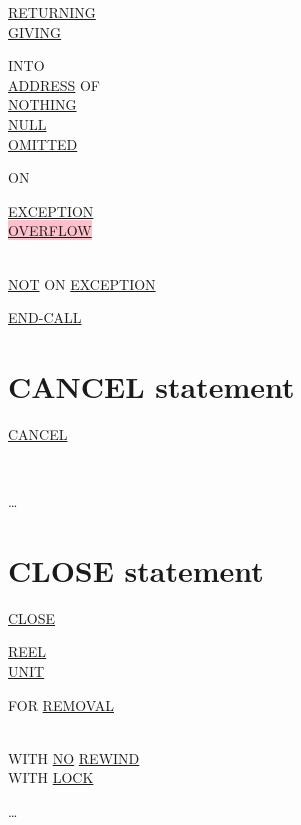 \documentclass[a4paper,oneside,svgnames]{scrbook}
\makeatletter
\newcommand{\key}[1]{\underline{#1}}
\newcommand{\archaic}[1]{%
  \colorbox{pink}{#1}}
\newcommand{\gnucobol}[1]{%
  \colorbox{orange!75}{#1}}
\newcommand{\miscext}[1]{%
  \colorbox{blue!50}{#1}}
\newenvironment{0-1}{$\left[ \begin{tabular}{@{}l@{}}}{\end{tabular} \right]$}
\newenvironment{0+}{$\left[\left| \begin{tabular}{@{}l@{}}}{\end{tabular} \right|\right]$}
\newenvironment{1=}{$\left\{ \begin{tabular}{@{}l@{}}}{\end{tabular} \right\}$}
\makeatother
\begin{document}
\begin{0-1}
  \begin{1=}
    \key{RETURNING} \\
    \miscext{\key{GIVING}}
  \end{1=}
  \begin{1=}
    INTO \identifier \\
    \key{ADDRESS} OF \identifier \\
    \gnucobol{\key{NOTHING}} \\
    \key{NULL} \\
    \key{OMITTED} \\
  \end{1=}
\end{0-1}

\begin{0+}
  ON
  \begin{1=}
    \key{EXCEPTION} \\
    \archaic{\key{OVERFLOW}}
  \end{1=}
  \imperativestatement \\
  \key{NOT} ON \key{EXCEPTION} \imperativestatement
\end{0+}

\begin{0-1}
  \key{END-CALL}
\end{0-1}

\section{CANCEL statement}

\key{CANCEL}
\begin{1=}
  \identifier \\
  \literal
\end{1=} \ldots

\section{CLOSE statement}

\key{CLOSE}
\begin{1=}
  \filename
  \begin{0-1}
    \begin{1=}
      \key{REEL} \\
      \key{UNIT}
    \end{1=}
    \begin{0-1}
      FOR \key{REMOVAL}
    \end{0-1} \\

    WITH \key{NO} \key{REWIND} \\
    WITH \key{LOCK}
  \end{0-1}
\end{1=} \ldots
\end{document}
